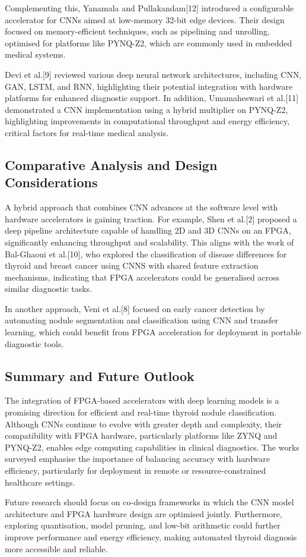 \noindent
Complementing this, Yanamala and Pullakandam[12] introduced a configurable accelerator for CNNs aimed at low-memory 32-bit edge devices. Their design focused on memory-efficient techniques, such as pipelining and unrolling, optimised for platforms like PYNQ-Z2, which are commonly used in embedded medical systems.

\noindent
Devi et al.[9] reviewed various deep neural network architectures, including CNN, GAN, LSTM, and RNN, highlighting their potential integration with hardware platforms for enhanced diagnostic support. In addition, Umamaheswari et al.[11] demonstrated a CNN implementation using a hybrid multiplier on PYNQ-Z2, highlighting improvements in computational throughput and energy efficiency, critical factors for real-time medical analysis.

\subsection{Comparative Analysis and Design Considerations}
\noindent
A hybrid approach that combines CNN advances at the software level with hardware accelerators is gaining traction. For example, Shen et al.[2] proposed a deep pipeline architecture capable of handling 2D and 3D CNNs on an FPGA, significantly enhancing throughput and scalability. This aligns with the work of Bal-Ghaoui et al.[10], who explored the classification of disease differences for thyroid and breast cancer using CNNS with shared feature extraction mechanisms, indicating that FPGA accelerators could be generalised across similar diagnostic tasks.

\noindent
In another approach, Veni et al.[8] focused on early cancer detection by automating nodule segmentation and classification using CNN and transfer learning, which could benefit from FPGA acceleration for deployment in portable diagnostic tools.

\subsection{Summary and Future Outlook}
\noindent
The integration of FPGA-based accelerators with deep learning models is a promising direction for efficient and real-time thyroid nodule classification. Although CNNs continue to evolve with greater depth and complexity, their compatibility with FPGA hardware, particularly platforms like ZYNQ and PYNQ-Z2, enables edge computing capabilities in clinical diagnostics. The works surveyed emphasise the importance of balancing accuracy with hardware efficiency, particularly for deployment in remote or resource-constrained healthcare settings.

\noindent
Future research should focus on co-design frameworks in which the CNN model architecture and FPGA hardware design are optimised jointly. Furthermore, exploring quantisation, model pruning, and low-bit arithmetic could further improve performance and energy efficiency, making automated thyroid diagnosis more accessible and reliable.
\newpage
